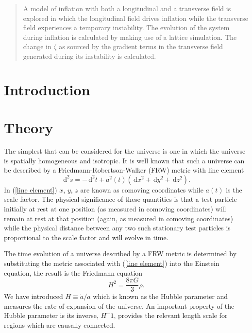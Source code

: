 \documentclass[letterpaper,11pt]{article}
\newcommand{\ud}{\,\mathrm{d}}
\begin{document}
\begin{abstract}
A model of inflation with both a longitudinal and a transverse field is explored in which the longitudinal field drives inflation while the transverse field experiences a temporary instability. The evolution of the system during inflation is calculated by making use of a lattice simulation. The change in $\zeta$ as sourced by the gradient terms in the transverse field generated during its instability is calculated.
\end{abstract}
\section{Introduction}
\section{Theory}
The simplest that can be considered for the universe is one in which the universe is spatially homogeneous and isotropic. It is well known that such a universe can be described by a Friedmann-Robertson-Walker (FRW) metric with line element
\begin{equation}
\ud^2s=-\ud^2t+a^2(t)(\ud x^2+\ud y^2+\ud z^2). \label{line element}
\end{equation}
In (\ref{line element}) $x$, $y$, $z$ are known as comoving coordinates while $a(t)$ is the scale factor. The physical significance of these quantities is that a test particle initially at rest at one position (as measured in comoving coordinates) will remain at rest at that position (again, as measured in comoving coordinates) while the physical distance between any two such stationary test particles is proportional to the scale factor and will evolve in time.

The time evolution of a universe described by a FRW metric is determined by substituting the metric associated with (\ref{line element}) into the Einstein equation, the result is the Friedmann equation
\begin{equation}
H^2=\frac{8\pi G}{3}\rho. \label{fried eqn}
\end{equation}
We have introduced $H\equiv \dot{a}/a$ which is known as the Hubble parameter and measures the rate of expansion of the universe. An important property of the Hubble parameter is its inverse, $H^-1$, provides the relevant length scale for regions which are causally connected.%
\end{document}
